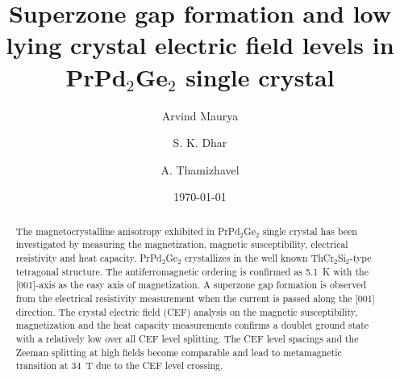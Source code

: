 \documentclass[preprint,showpacs,preprintnumbers,amsmath,amssymb, prb]{revtex4}
\begin{document}
\title{Superzone gap formation and low lying crystal electric field levels in PrPd$_2$Ge$_2$ single crystal}


\author{Arvind Maurya}


\author{S. K. Dhar}

\author{A. Thamizhavel}


\date{\today}%

\begin{abstract}
The magnetocrystalline anisotropy exhibited in PrPd$_2$Ge$_2$ single crystal has been investigated by measuring the magnetization, magnetic susceptibility, electrical resistivity and heat capacity.  PrPd$_2$Ge$_2$ crystallizes in the well known 
ThCr$_2$Si$_2$\--type tetragonal structure. The antiferromagnetic ordering  is confirmed as 5.1~K with the [001]-axis as the easy axis of magnetization.  A superzone gap formation is observed from the electrical resistivity measurement when the current is passed along the [001] direction.  The crystal electric field (CEF) analysis on the magnetic susceptibility, magnetization and the heat capacity measurements confirms a doublet ground state with a relatively low over all CEF level splitting.  The CEF level spacings and the Zeeman splitting at high fields become comparable and lead to metamagnetic transition at 34~T due to the CEF level crossing.  


\end{abstract}



\maketitle
\end{document}
